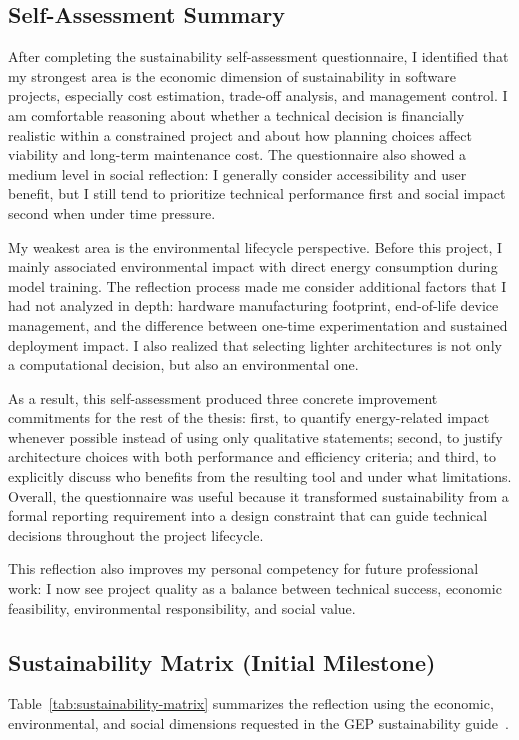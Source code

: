 \documentclass[11pt, a4paper]{article}
\begin{document}
\subsection{Self-Assessment Summary}
After completing the sustainability self-assessment questionnaire, I identified that my strongest area is the economic dimension of sustainability in software projects, especially cost estimation, trade-off analysis, and management control. I am comfortable reasoning about whether a technical decision is financially realistic within a constrained project and about how planning choices affect viability and long-term maintenance cost. The questionnaire also showed a medium level in social reflection: I generally consider accessibility and user benefit, but I still tend to prioritize technical performance first and social impact second when under time pressure.

My weakest area is the environmental lifecycle perspective. Before this project, I mainly associated environmental impact with direct energy consumption during model training. The reflection process made me consider additional factors that I had not analyzed in depth: hardware manufacturing footprint, end-of-life device management, and the difference between one-time experimentation and sustained deployment impact. I also realized that selecting lighter architectures is not only a computational decision, but also an environmental one.

As a result, this self-assessment produced three concrete improvement commitments for the rest of the thesis: first, to quantify energy-related impact whenever possible instead of using only qualitative statements; second, to justify architecture choices with both performance and efficiency criteria; and third, to explicitly discuss who benefits from the resulting tool and under what limitations. Overall, the questionnaire was useful because it transformed sustainability from a formal reporting requirement into a design constraint that can guide technical decisions throughout the project lifecycle.

This reflection also improves my personal competency for future professional work: I now see project quality as a balance between technical success, economic feasibility, environmental responsibility, and social value.

\subsection{Sustainability Matrix (Initial Milestone)}
Table~\ref{tab:sustainability-matrix} summarizes the reflection using the economic, environmental, and social dimensions requested in the GEP sustainability guide~\cite{gepSustainabilityReport2018}.
\end{document}
